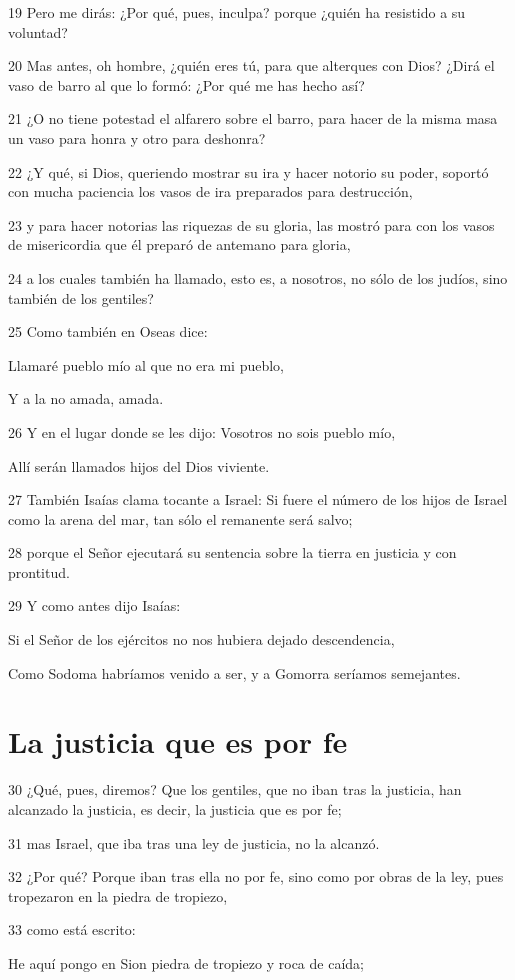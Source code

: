 \par 19 Pero me dirás: ¿Por qué, pues, inculpa? porque ¿quién ha resistido a su voluntad?
\par 20 Mas antes, oh hombre, ¿quién eres tú, para que alterques con Dios? ¿Dirá el vaso de barro al que lo formó: ¿Por qué me has hecho así?
\par 21 ¿O no tiene potestad el alfarero sobre el barro, para hacer de la misma masa un vaso para honra y otro para deshonra?
\par 22 ¿Y qué, si Dios, queriendo mostrar su ira y hacer notorio su poder, soportó con mucha paciencia los vasos de ira preparados para destrucción,
\par 23 y para hacer notorias las riquezas de su gloria, las mostró para con los vasos de misericordia que él preparó de antemano para gloria,
\par 24 a los cuales también ha llamado, esto es, a nosotros, no sólo de los judíos, sino también de los gentiles?
\par 25 Como también en Oseas dice:
\par Llamaré pueblo mío al que no era mi pueblo,
\par Y a la no amada, amada.
\par 26 Y en el lugar donde se les dijo: Vosotros no sois pueblo mío,
\par Allí serán llamados hijos del Dios viviente.
\par 27 También Isaías clama tocante a Israel: Si fuere el número de los hijos de Israel como la arena del mar, tan sólo el remanente será salvo;
\par 28 porque el Señor ejecutará su sentencia sobre la tierra en justicia y con prontitud.
\par 29 Y como antes dijo Isaías:
\par Si el Señor de los ejércitos no nos hubiera dejado descendencia,
\par Como Sodoma habríamos venido a ser, y a Gomorra seríamos semejantes.

\section*{La justicia que es por fe}

\par 30 ¿Qué, pues, diremos? Que los gentiles, que no iban tras la justicia, han alcanzado la justicia, es decir, la justicia que es por fe;
\par 31 mas Israel, que iba tras una ley de justicia, no la alcanzó.
\par 32 ¿Por qué? Porque iban tras ella no por fe, sino como por obras de la ley, pues tropezaron en la piedra de tropiezo,
\par 33 como está escrito:
\par He aquí pongo en Sion piedra de tropiezo y roca de caída;
